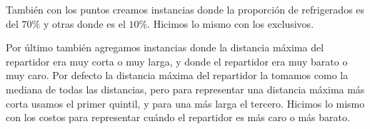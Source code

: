 \documentclass[10pt]{article}
\begin{document}
	También con los puntos creamos instancias donde la proporción de refrigerados es del $70\%$ y otras donde es el $10\%$. Hicimos lo mismo con los exclusivos.

	Por último también agregamos instancias donde la distancia máxima del repartidor era muy corta o muy larga, y donde el repartidor era muy barato o muy caro. Por defecto la distancia máxima del repartidor la tomamos como la mediana de todas las distancias, pero para representar una distancia máxima más corta usamos el primer quintil, y para una más larga el tercero. Hicimos lo mismo con los costos para representar cuándo el repartidor es más caro o más barato.
\end{document}
